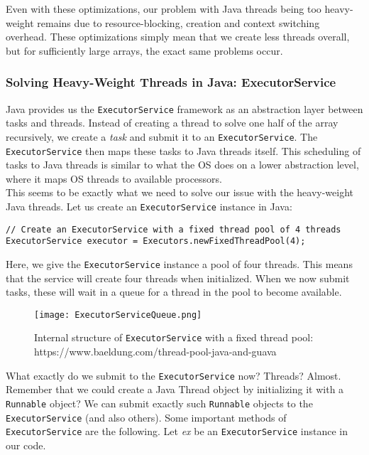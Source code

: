 \documentclass[main.tex]{subfiles}
\begin{document}
\noindent Even with these optimizations, our problem with Java threads being too heavy-weight remains due to resource-blocking, creation and context switching overhead. These optimizations simply mean that we create less threads overall, but for sufficiently large arrays, the exact same problems occur.

\subsubsection{Solving Heavy-Weight Threads in Java: ExecutorService}
\label{ExecutorService}
Java provides us the \texttt{ExecutorService} framework as an abstraction layer between tasks and threads. Instead of creating a thread to solve one half of the array recursively, we create a \textit{task} and submit it to an \texttt{ExecutorService}. The \texttt{ExecutorService} then maps these tasks to Java threads itself. This scheduling of tasks to Java threads is similar to what the OS does on a lower abstraction level, where it maps OS threads to available processors.\\[3mm]
This seems to be exactly what we need to solve our issue with the heavy-weight Java threads. Let us create an \texttt{ExecutorService} instance in Java:
\begin{verbatim}
// Create an ExecutorService with a fixed thread pool of 4 threads
ExecutorService executor = Executors.newFixedThreadPool(4);
\end{verbatim}
\noindent Here, we give the \texttt{ExecutorService} instance a pool of four threads. This means that the service will create four threads when initialized. When we now submit tasks, these will wait in a queue for a thread in the pool to become available.
\begin{figure}[H]
    \centering
    \texttt{[image: ExecutorServiceQueue.png]}
    \caption{Internal structure of \texttt{ExecutorService} with a fixed thread pool: https://www.baeldung.com/thread-pool-java-and-guava}
\end{figure}
\noindent What exactly do we submit to the \texttt{ExecutorService} now? Threads? Almost. Remember that we could create a Java Thread object by initializing it with a \texttt{Runnable} object? We can submit exactly such \texttt{Runnable} objects to the \texttt{ExecutorService} (and also others). Some important methods of \texttt{ExecutorService} are the following. Let \textit{ex} be an \texttt{ExecutorService} instance in our code.
\end{document}
